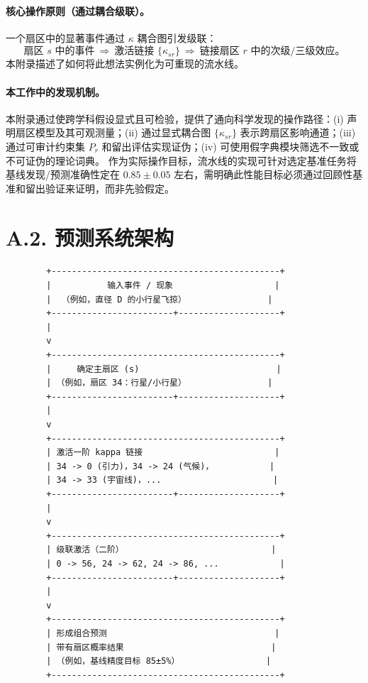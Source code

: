 \documentclass[11pt,a4paper]{article}
\begin{document}
	\paragraph{核心操作原则（通过耦合级联）。}
	一个扇区中的显著事件通过 $\kappa$ 耦合图引发级联：
	\[
	\text{扇区 }s \text{ 中的事件} \ \Rightarrow\ \text{激活链接 }\{\kappa_{sr}\}\ \Rightarrow\ \text{链接扇区 }r \text{ 中的次级/三级效应}。
	\]
	本附录描述了如何将此想法实例化为可重现的流水线。
	
	\paragraph{本工作中的发现机制。}
	本附录通过使跨学科假设显式且可检验，提供了通向科学发现的操作路径：(i) 声明扇区模型及其可观测量；(ii) 通过显式耦合图 $\{\kappa_{sr}\}$ 表示跨扇区影响通道；(iii) 通过可审计约束集 $P_r$ 和留出评估实现证伪；(iv) 可使用假字典模块筛选不一致或不可证伪的理论词典。
	作为实际操作目标，流水线的实现可针对选定基准任务将基线发现/预测准确性定在 $0.85\pm0.05$ 左右，需明确此性能目标必须通过回顾性基准和留出验证来证明，而非先验假定。
	
	\section*{A.2. 预测系统架构}
	
	\begin{lstlisting}
		+---------------------------------------------+
		|           输入事件 / 现象                    |
		|  （例如，直径 D 的小行星飞掠）                |
		+------------------------+--------------------+
		|
		v
		+---------------------------------------------+
		|     确定主扇区 (s)                           |
		| （例如，扇区 34：行星/小行星）                |
		+------------------------+--------------------+
		|
		v
		+---------------------------------------------+
		| 激活一阶 kappa 链接                          |
		| 34 -> 0 (引力)，34 -> 24 (气候)，           |
		| 34 -> 33 (宇宙线)，...                      |
		+------------------------+--------------------+
		|
		v
		+---------------------------------------------+
		| 级联激活（二阶）                             |
		| 0 -> 56, 24 -> 62, 24 -> 86, ...            |
		+------------------------+--------------------+
		|
		v
		+---------------------------------------------+
		| 形成组合预测                                 |
		| 带有扇区概率结果                             |
		| （例如，基线精度目标 85±5%）                 |
		+---------------------------------------------+
	\end{lstlisting}
	
\end{document}
